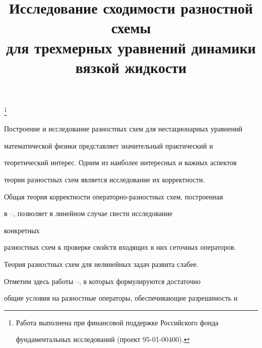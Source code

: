 \title{Исследование сходимости разностной схемы \\


для трехмерных уравнений динамики вязкой жидкости}





\thanks{Работа выполнена при финансовой поддержке Российского фонда


фундаментальных исследований (проект 95-01-00400).}


\date{}







\pagestyle{plain} %













\maketitle


\label{begin}








Построение и исследование разностных схем для нестационарных уравнений 


математической физики представляет значительный практический и 


теоретический интерес. Одним из наиболее интересных и важных аспектов 


теории разностных схем является исследование их корректности. 


Общая теория корректности операторно-разностных схем, построенная 


в \cite{1}--\cite{4}, позволяет в линейном случае свести исследование


конкретных


разностных схем к проверке свойств входящих в них сеточных операторов. 


Теория разностных схем для нелинейных задач развита слабее. 


Отметим здесь работы \cite{5}--\cite{F}, в которых формулируются достаточно 


общие условия на разностные операторы, обеспечивающие разрешимость и 


